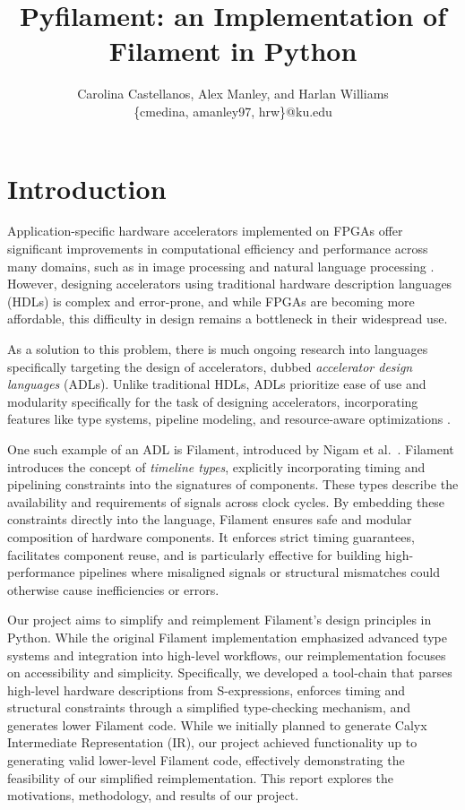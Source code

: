 \documentclass[12pt,a4paper]{article}
\title{Pyfilament: an Implementation of Filament in Python}
\author{Carolina Castellanos, Alex Manley, and Harlan Williams\\\{cmedina, amanley97, hrw\}@ku.edu}
\date{}
\begin{document}
\maketitle

\section{Introduction}

Application-specific hardware accelerators implemented on FPGAs offer significant improvements in computational efficiency and performance across many domains, such as in image processing \cite{hegarty2014darkroom} and natural language processing \cite{khan21}. However, designing accelerators using traditional hardware description languages (HDLs) is complex and error-prone, and while FPGAs are becoming more affordable, this difficulty in design remains a bottleneck in their widespread use.

As a solution to this problem, there is much ongoing research into languages specifically targeting the design of accelerators, dubbed \emph{accelerator design languages} (ADLs). Unlike traditional HDLs, ADLs prioritize ease of use and modularity specifically for the task of designing accelerators, incorporating features like type systems, pipeline modeling, and resource-aware optimizations \cite{sampson2021adl}.

One such example of an ADL is Filament, introduced by Nigam et al.~\cite{nigam2023filament}. Filament introduces the concept of \emph{timeline types}, explicitly incorporating timing and pipelining constraints into the signatures of components. These types describe the availability and requirements of signals across clock cycles. By embedding these constraints directly into the language, Filament ensures safe and modular composition of hardware components. It enforces strict timing guarantees, facilitates component reuse, and is particularly effective for building high-performance pipelines where misaligned signals or structural mismatches could otherwise cause inefficiencies or errors.

Our project aims to simplify and reimplement Filament’s design principles in Python. While the original Filament implementation emphasized advanced type systems and integration into high-level workflows, our reimplementation focuses on accessibility and simplicity. Specifically, we developed a tool-chain that parses high-level hardware descriptions from S-expressions, enforces timing and structural constraints through a simplified type-checking mechanism, and generates lower Filament code. While we initially planned to generate Calyx \cite{nigam2021calyx} Intermediate Representation (IR), our project achieved functionality up to generating valid lower-level Filament code, effectively demonstrating the feasibility of our simplified reimplementation. This report explores the motivations, methodology, and results of our project. 
\end{document}
